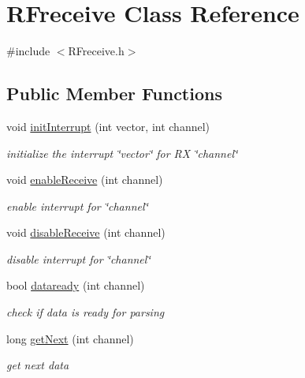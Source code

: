 \hypertarget{class_r_freceive}{}\section{R\+Freceive Class Reference}
\label{class_r_freceive}


{\ttfamily \#include $<$R\+Freceive.\+h$>$}

\subsection*{Public Member Functions}
\begin{DoxyCompactItemize}
\item 
void \mbox{\hyperlink{class_r_freceive_a1449b9fc5ca1c08869eadd3990d9236c}{init\+Interrupt}} (int vector, int channel)
\begin{DoxyCompactList}\small\item\em initialize the interrupt \char`\"{}vector\char`\"{} for RX \char`\"{}channel\char`\"{} \end{DoxyCompactList}\item 
void \mbox{\hyperlink{class_r_freceive_afb1e852bcae003d5d119debc4e73a2eb}{enable\+Receive}} (int channel)
\begin{DoxyCompactList}\small\item\em enable interrupt for \char`\"{}channel\char`\"{} \end{DoxyCompactList}\item 
void \mbox{\hyperlink{class_r_freceive_ab8b545efe94b82be8d1feef08c29340d}{disable\+Receive}} (int channel)
\begin{DoxyCompactList}\small\item\em disable interrupt for \char`\"{}channel\char`\"{} \end{DoxyCompactList}\item 
bool \mbox{\hyperlink{class_r_freceive_a2d3c05696fabff62bdc06e1feedadc48}{dataready}} (int channel)
\begin{DoxyCompactList}\small\item\em check if data is ready for parsing \end{DoxyCompactList}\item 
long \mbox{\hyperlink{class_r_freceive_a19e27dbf9e597c8df7fd0ba5ebcddcb4}{get\+Next}} (int channel)
\begin{DoxyCompactList}\small\item\em get next data \end{DoxyCompactList}\item 

\end{DoxyCompactItemize}
